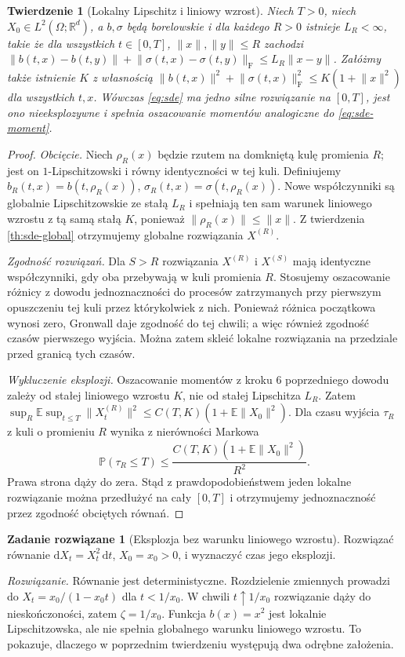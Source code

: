 \documentclass[11pt,a4paper,oneside]{report}
\numberwithin{equation}{chapter}
\theoremstyle{plain}
\newtheorem{twierdzenie}{Twierdzenie}[chapter]
\theoremstyle{definition}
\newtheorem{zadanie}{Zadanie rozwiązane}[chapter]
\theoremstyle{remark}
\newcommand{\R}{\mathbb{R}}
\newcommand{\Prob}{\mathbb{P}}
\newcommand{\E}{\mathbb{E}}
\newcommand{\dd}{\mathrm{d}}
\newcommand{\norm}[1]{\lVert #1\rVert}
\begin{document}
\begin{twierdzenie}[Lokalny Lipschitz i liniowy wzrost]
\label{th:sde-local}
Niech $T>0$, niech $X_0\in L^2(\Omega;\R^d)$,
a $b,\sigma$ będą borelowskie i dla każdego $R>0$
istnieje $L_R<\infty$, takie że dla wszystkich
$t\in[0,T]$, $\norm x,\norm y\le R$ zachodzi
$\norm{b(t,x)-b(t,y)}+\norm{\sigma(t,x)-\sigma(t,y)}_{\mathrm F}
\le L_R\norm{x-y}$.
Załóżmy także istnienie $K$ z własnością
$\norm{b(t,x)}^2+\norm{\sigma(t,x)}_{\mathrm F}^2
\le K(1+\norm{x}^2)$ dla wszystkich $t,x$.
Wówczas \eqref{eq:sde} ma jedno silne rozwiązanie
na $[0,T]$, jest ono nieeksplozywne i spełnia
oszacowanie momentów analogiczne do \eqref{eq:sde-moment}.
\end{twierdzenie}
\begin{proof}
\emph{Obcięcie.} Niech $\rho_R(x)$ będzie rzutem
na domkniętą kulę promienia $R$; jest on $1$-Lipschitzowski
i równy identyczności w tej kuli. Definiujemy
$b_R(t,x)=b(t,\rho_R(x))$,
$\sigma_R(t,x)=\sigma(t,\rho_R(x))$.
Nowe współczynniki są globalnie Lipschitzowskie
ze stałą $L_R$ i spełniają ten sam warunek liniowego
wzrostu z tą samą stałą $K$, ponieważ
$\norm{\rho_R(x)}\le\norm x$.
Z twierdzenia \ref{th:sde-global} otrzymujemy
globalne rozwiązania $X^{(R)}$.

\emph{Zgodność rozwiązań.} Dla $S>R$ rozwiązania
$X^{(R)}$ i $X^{(S)}$ mają identyczne współczynniki,
gdy oba przebywają w kuli promienia $R$.
Stosujemy oszacowanie różnicy z dowodu jednoznaczności
do procesów zatrzymanych przy pierwszym opuszczeniu tej kuli
przez którykolwiek z nich. Ponieważ różnica początkowa
wynosi zero, Gronwall daje zgodność do tej chwili;
a więc również zgodność czasów pierwszego wyjścia.
Można zatem skleić lokalne rozwiązania na przedziale
przed granicą tych czasów.

\emph{Wykluczenie eksplozji.} Oszacowanie momentów z
kroku 6 poprzedniego dowodu zależy od stałej liniowego
wzrostu $K$, nie od stałej Lipschitza $L_R$.
Zatem $\sup_R\E\sup_{t\le T}\norm{X_t^{(R)}}^2
\le C(T,K)(1+\E\norm{X_0}^2)$.
Dla czasu wyjścia $\tau_R$ z kuli o promieniu $R$
wynika z nierówności Markowa
\[
\Prob(\tau_R\le T)\le
\frac{C(T,K)(1+\E\norm{X_0}^2)}{R^2}.
\]
Prawa strona dąży do zera. Stąd z prawdopodobieństwem
jeden lokalne rozwiązanie można przedłużyć na cały
$[0,T]$ i otrzymujemy jednoznaczność przez zgodność
obciętych równań.
\end{proof}

\begin{zadanie}[Eksplozja bez warunku liniowego wzrostu]
Rozwiązać równanie $\dd X_t=X_t^2\,\dd t$,
$X_0=x_0>0$, i wyznaczyć czas jego eksplozji.

\emph{Rozwiązanie.} Równanie jest deterministyczne.
Rozdzielenie zmiennych prowadzi do
$X_t=x_0/(1-x_0t)$ dla $t<1/x_0$.
W chwili $t\uparrow1/x_0$ rozwiązanie dąży do
nieskończoności, zatem $\zeta=1/x_0$. Funkcja
$b(x)=x^2$ jest lokalnie Lipschitzowska, ale nie
spełnia globalnego warunku liniowego wzrostu.
To pokazuje, dlaczego w poprzednim twierdzeniu
występują dwa odrębne założenia.
\end{zadanie}
\end{document}
